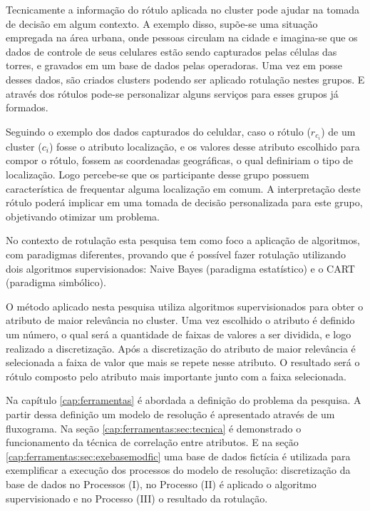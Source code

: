Tecnicamente a informação do rótulo aplicada no cluster pode ajudar na tomada de decisão em algum contexto. A exemplo disso, supõe-se uma situação empregada na área urbana, onde pessoas circulam na cidade e imagina-se que os dados de controle de seus celulares estão sendo capturados pelas células das torres, e gravados em um base de dados pelas operadoras. Uma vez em posse desses dados, são criados clusters podendo ser aplicado rotulação nestes grupos. E através dos rótulos pode-se personalizar alguns serviços para esses grupos já formados. 

Seguindo o exemplo dos dados capturados do celuldar, caso o rótulo (${r_{c_i}}$) de um cluster (${c_i}$) fosse o  atributo localização, e os valores  desse atributo escolhido para compor o rótulo, fossem as coordenadas geográficas, o qual definiriam o tipo de localização. Logo percebe-se que os participante desse grupo possuem característica de frequentar alguma localização em comum. A interpretação deste rótulo poderá implicar em uma tomada de decisão personalizada para este grupo, objetivando otimizar um problema.

No contexto de rotulação esta pesquisa tem como foco a aplicação de algoritmos, com paradigmas diferentes, provando que é possível fazer rotulação utilizando dois  algoritmos supervisionados: Naive Bayes (paradigma estatístico) e o CART (paradigma simbólico).

O método aplicado nesta pesquisa utiliza algoritmos supervisionados para obter o atributo de maior relevância no cluster. Uma vez escolhido o atributo é definido um número, o qual será a quantidade de faixas de valores a ser dividida, e logo realizado a discretização. Após a discretização do atributo de maior relevância é selecionada a faixa de valor que mais se repete nesse atributo. O resultado será o rótulo composto pelo atributo mais importante junto com a faixa selecionada.   

Na capítulo \ref{cap:ferramentas} é abordada a definição do problema da pesquisa. A partir dessa definição um modelo de resolução é apresentado através de um fluxograma. Na seção \ref{cap:ferramentas:sec:tecnica} é demonstrado o funcionamento da técnica de correlação entre atributos. E na seção \ref{cap:ferramentas:sec:exebasemodfic} uma base de dados fictícia é utilizada para exemplificar a execução dos processos do modelo de resolução: discretização da base de dados no Processos (I), no Processo (II) é aplicado o algoritmo supervisionado e no Processo (III) o resultado da rotulação. 

